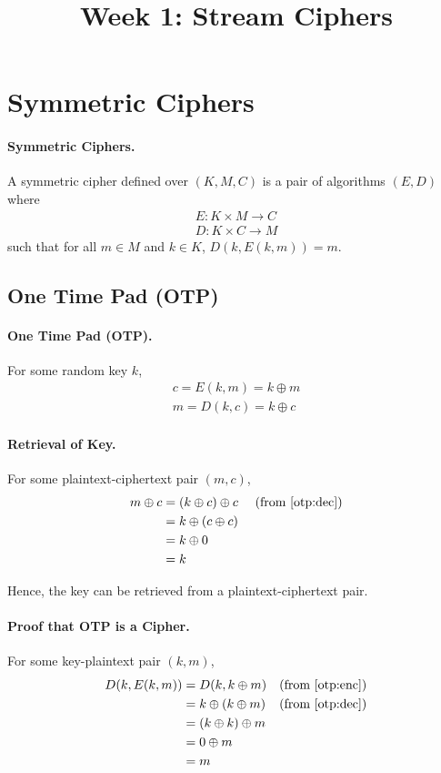 \documentclass{article}
\begin{document}
\title{Week 1: Stream Ciphers}
\maketitle

\section{Symmetric Ciphers}

\paragraph{Symmetric Ciphers.} A symmetric cipher defined over $(K, M, C)$ is a pair of algorithms $(E, D)$ where \begin{gather*}
  E: K \times M \rightarrow C \\
  D: K \times C \rightarrow M
\end{gather*} such that for all $m \in M$ and $k \in K$, $D(k, E(k, m)) = m$.

\subsection{One Time Pad (OTP)}

\paragraph{One Time Pad (OTP).} For some random key $k$, \begin{gather}
  c = E(k, m) = k \oplus m \label{otp:enc} \\
  m = D(k, c) = k \oplus c \label{otp:dec}
\end{gather}

\paragraph{Retrieval of Key.} For some plaintext-ciphertext pair $(m, c)$, \begin{align*}
  m \oplus c &= (k \oplus c) \oplus c &&\text{ (from \eqref{otp:dec})} \\
            &= k \oplus (c \oplus c) \\
            &= k \oplus 0 \\
            &= k
\end{align*}

Hence, the key can be retrieved from a plaintext-ciphertext pair.

\paragraph{Proof that OTP is a Cipher.} For some key-plaintext pair $(k, m)$, \begin{align*}
  D(k, E(k, m)) &= D(k, k \oplus m) &&\text{(from \eqref{otp:enc})}\\
                &= k \oplus (k \oplus m) &&\text{(from \eqref{otp:dec})}\\
                &= (k \oplus k) \oplus m \\
                &= 0 \oplus m \\
                &= m
\end{align*}
\end{document}
